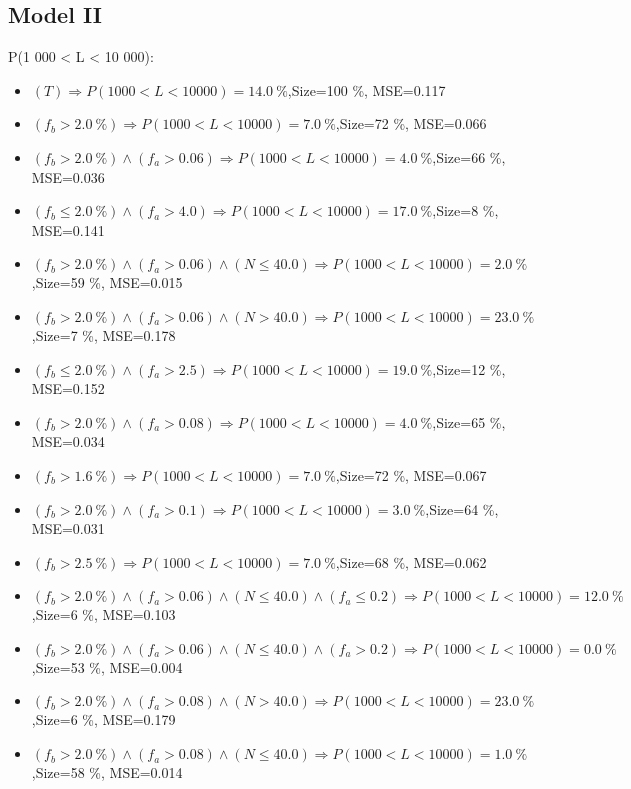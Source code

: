 \documentclass[numbered]{CSL}
\begin{document}
\subsection{Model II}
P(1 000 < L < 10 000):
\begin{itemize}
\item $(T) \Rightarrow P(1 000 < L < 10 000) = 14.0~\%$,\hfill Size=100 \%, MSE=0.117
\item $(f_b > 2.0~\%) \Rightarrow P(1 000 < L < 10 000) = 7.0~\%$,\hfill Size=72 \%, MSE=0.066
\item $(f_b > 2.0~\%) \land (f_a > 0.06) \Rightarrow P(1 000 < L < 10 000) = 4.0~\%$,\hfill Size=66 \%, MSE=0.036
\item $(f_b \leq 2.0~\%) \land (f_a > 4.0) \Rightarrow P(1 000 < L < 10 000) = 17.0~\%$,\hfill Size=8 \%, MSE=0.141
\item $(f_b > 2.0~\%) \land (f_a > 0.06) \land (N \leq 40.0) \Rightarrow P(1 000 < L < 10 000) = 2.0~\%$,\hfill Size=59 \%, MSE=0.015
\item $(f_b > 2.0~\%) \land (f_a > 0.06) \land (N > 40.0) \Rightarrow P(1 000 < L < 10 000) = 23.0~\%$,\hfill Size=7 \%, MSE=0.178
\item $(f_b \leq 2.0~\%) \land (f_a > 2.5) \Rightarrow P(1 000 < L < 10 000) = 19.0~\%$,\hfill Size=12 \%, MSE=0.152
\item $(f_b > 2.0~\%) \land (f_a > 0.08) \Rightarrow P(1 000 < L < 10 000) = 4.0~\%$,\hfill Size=65 \%, MSE=0.034
\item $(f_b > 1.6~\%) \Rightarrow P(1 000 < L < 10 000) = 7.0~\%$,\hfill Size=72 \%, MSE=0.067
\item $(f_b > 2.0~\%) \land (f_a > 0.1) \Rightarrow P(1 000 < L < 10 000) = 3.0~\%$,\hfill Size=64 \%, MSE=0.031
\item $(f_b > 2.5~\%) \Rightarrow P(1 000 < L < 10 000) = 7.0~\%$,\hfill Size=68 \%, MSE=0.062
\item $(f_b > 2.0~\%) \land (f_a > 0.06) \land (N \leq 40.0) \land (f_a \leq 0.2) \Rightarrow P(1 000 < L < 10 000) = 12.0~\%$,\hfill Size=6 \%, MSE=0.103
\item $(f_b > 2.0~\%) \land (f_a > 0.06) \land (N \leq 40.0) \land (f_a > 0.2) \Rightarrow P(1 000 < L < 10 000) = 0.0~\%$,\hfill Size=53 \%, MSE=0.004
\item $(f_b > 2.0~\%) \land (f_a > 0.08) \land (N > 40.0) \Rightarrow P(1 000 < L < 10 000) = 23.0~\%$,\hfill Size=6 \%, MSE=0.179
\item $(f_b > 2.0~\%) \land (f_a > 0.08) \land (N \leq 40.0) \Rightarrow P(1 000 < L < 10 000) = 1.0~\%$,\hfill Size=58 \%, MSE=0.014

\end{itemize}
\end{document}
